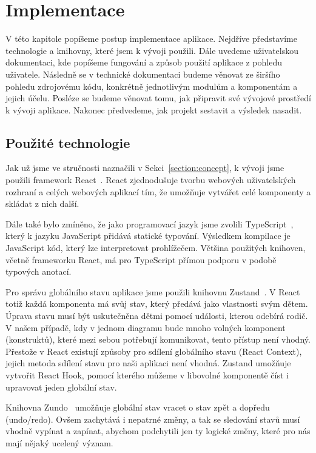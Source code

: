 \chapter{Implementace}\label{chapter:implementace}

V této kapitole popíšeme postup implementace aplikace.
Nejdříve představíme technologie a knihovny, které jsem k vývoji použili.
Dále uvedeme uživatelskou dokumentaci, kde popíšeme fungování a způsob použití aplikace z pohledu uživatele.
Následně se v technické dokumentaci budeme věnovat ze širšího pohledu zdrojovému kódu, konkrétně jednotlivým modulům a komponentám a jejich účelu.
Posléze se budeme věnovat tomu, jak připravit své vývojové prostředí k vývoji aplikace.
Nakonec předvedeme, jak projekt sestavit a výsledek nasadit.

\section{Použité technologie}

Jak už jsme ve stručnosti naznačili v Sekci~\ref{section:concept}, k vývoji jsme použili framework React~\cite{react_2023}.
React zjednodušuje tvorbu webových uživatelských rozhraní a celých webových aplikací tím, že umožňuje vytvářet celé komponenty a skládat z nich další.

Dále také bylo zmíněno, že jako programovací jazyk jsme zvolili TypeScript~\cite{microsoft_typescriptjavascript_2023}, který k jazyku JavaScript přidává statické typování.
Výsledkem kompilace je JavaScript kód, který lze interpretovat prohlížečem.
Většina použitých knihoven, včetně frameworku React, má pro TypeScript přímou podporu v podobě typových anotací.

Pro správu globálního stavu aplikace jsme použili knihovnu Zustand~\cite{daishikato_zustand_2023}.
V React totiž každá komponenta má svůj stav, který předává jako vlastnosti svým dětem.
Úprava stavu musí být uskutečněna dětmi pomocí události, kterou odebírá rodič.
V našem případě, kdy v jednom diagramu bude mnoho volných komponent (konstruktů), které mezi sebou potřebují komunikovat, tento přístup není vhodný.
Přestože v React existují způsoby pro sdílení globálního stavu (React Context), jejich metoda sdílení stavu pro naši aplikaci není vhodná.
Zustand umožňuje vytvořit React Hook, pomocí kterého můžeme v libovolné komponentě číst i upravovat jeden globální stav.

Knihovna Zundo~\cite{kornoelje_zundo_2023} umožňuje globální stav vracet o stav zpět a dopředu (undo/redo).
Ovšem zachytává i nepatrné změny, a tak se sledování stavů musí vhodně vypínat a zapínat, abychom podchytili jen ty logické změny, které pro nás mají nějaký ucelený význam.

